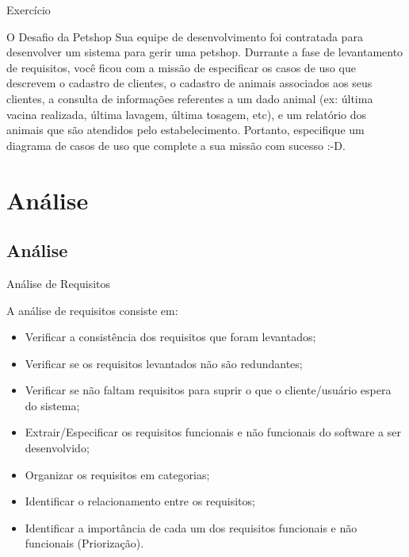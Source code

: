 \documentclass[xcolor=x11names,compress]{beamer}
\begin{document}
\begin{frame}{Exercício}

\begin{alertblock}{O Desafio da Petshop}
Sua equipe de desenvolvimento foi contratada para desenvolver um sistema para gerir uma petshop. Durrante a fase de levantamento de requisitos, você ficou com a missão de especificar os casos de uso que descrevem o cadastro de clientes, o cadastro de animais associados aos seus clientes, a consulta de informações referentes a um dado animal (ex: última vacina realizada, última lavagem, última tosagem, etc), e um relatório dos animais que são atendidos pelo estabelecimento. Portanto, especifique um diagrama de casos de uso que complete a sua missão com sucesso :-D. 
\end{alertblock}

\end{frame}

\section{Análise}

\subsection{Análise}

\begin{frame}[allowframebreaks=.7]{Análise de Requisitos}

A análise de requisitos consiste em:

\begin{itemize}
\itemsep 5mm

\item Verificar a consistência dos requisitos que foram levantados;

\item Verificar se os requisitos levantados não são redundantes;

\item Verificar se não faltam requisitos para suprir o que o cliente/usuário espera do sistema;

\item Extrair/Especificar os requisitos funcionais e não funcionais do software a ser desenvolvido;

\item Organizar os requisitos em categorias;

\item Identificar o relacionamento entre os requisitos;

\item Identificar a importância de cada um dos requisitos funcionais e não funcionais (Priorização).

\end{itemize}

\end{frame}
\end{document}
